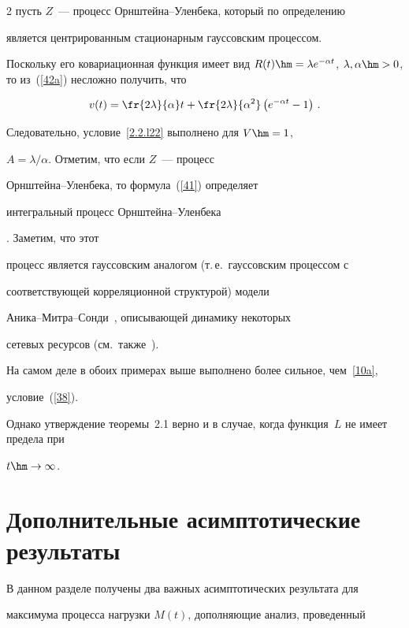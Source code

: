 \begin{multicols}{2}
пусть  $Z$~--- процесс Орн\-штей\-на--Улен\-бе\-ка, который по определению


является центрированным стационарным гауссовским процессом.


Поскольку его  ковариационная функция  имеет вид $R(t)\hm=\lambda


e^{-\alpha t}$, $\lambda,\alpha\hm>0$, то из~(\ref{42a}) несложно получить, что


$$


v(t)=\fr{2 \lambda}{\alpha}t+\fr{2\lambda}{\alpha^2}\left(e^{-\alpha t}-1\right)\,.


$$


Следовательно, условие~\eqref{2.2.l22} выполнено для $V\hm=1$,


$A={\lambda}/{\alpha}$. Отметим, что  если   $Z$~--- процесс


Орн\-штей\-на--Улен\-бе\-ка,  то формула~(\ref{41}) определяет   {\it


интегральный процесс Орн\-штей\-на--Улен\-бе\-ка}.  Заметим, что этот


процесс является гауссовским аналогом (т.\,е.\ гауссовским процессом с


соответствующей корреляционной структурой) модели


Ани\-ка--Мит\-ра--Сон\-ди~\cite{Anick}, описывающей динамику некоторых


сетевых ресурсов (см.\ так\-же~\cite{Addie}).





На самом деле в обоих примерах выше  выполнено   более сильное, чем~\eqref{10a}, 


условие~(\ref{38}).


Однако утверждение теоремы~2.1  верно и в случае, когда функция~$L$ не имеет предела при 


$t\hm\to\infty$.





\section{Дополнительные асимптотические результаты}





В данном разделе получены два важных асимптотических результата для


максимума процесса нагрузки $M(t)$, дополняющие анализ, проведенный



\end{multicols}
